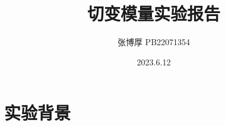 \documentclass[12pt,a4paper,oneside]{ctexart}
\title{切变模量实验报告}
\author{张博厚 PB22071354}
\date{2023.6.12}
\begin{document}
\maketitle
\newpage
\section{实验背景}
\end{document}
